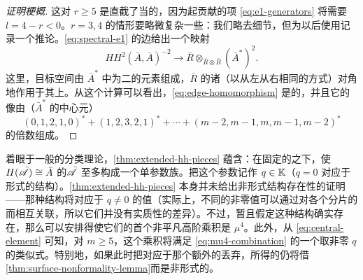 \begin{proof}[证明梗概]
这对 $r\ge 5$ 是直截了当的，因为起贡献的项 \eqref{eq:e1-generators} 将需要 $l=4-r<0$。$r=3,4$ 的情形要略微复杂一些：我们略去细节，但为以后使用记录一个推论。\eqref{eq:spectral-e1} 的边\trHomomorphism{}给出一个映射
\begin{equation}\label{eq:edge-homomorphism}
HH^2(\bar{A},\bar{A})^{-2}\longrightarrow
\bar{R}\otimes_{\bar{R}\otimes\bar{R}}(\bar{A}^*)^2.
\end{equation}
这里，目标空间由 $\bar{A}^*$ 中\trDegree{}为二的元素组成，$\bar{R}$ 的诸\trIdempotent{}（以从左从右相同的方式）对角地作用于其上。从这个计算可以看出，\eqref{eq:edge-homomorphism} 是\trInjective{}的，并且它的像由（$\bar{A}^*$ 的中心元）
\begin{equation}\label{eq:central-element}
(0,1,2,1,0)^*+(1,2,3,2,1)^*+\cdots+(m-2,m-1,m,m-1,m-2)^*
\end{equation}
的倍数组成。
\end{proof}
着眼于一般的分类理论，\cref{thm:extended-hh-pieces} 蕴含：在固定\trCohomology{}的\trQuasiisomorphism{}之下，使 $H(\bar{\mathscr{A}})\cong\bar{A}$ 的\trACategory{}$\bar{\mathscr{A}}$ 至多构成一个单参数族。把这个参数记作 $q\in\mathbb{K}$（$q=0$ 对应于形式的\trAinfty{}结构）。\cref{thm:extended-hh-pieces} 本身并未给出非形式结构存在性的证明——那种结构将对应于 $q\ne 0$ 的值（实际上，不同的非零值可以通过对各个\trGraded{}分片的\trRescaling{}而相互关联，所以它们并没有实质性的差异）。不过，暂且假定这种结构确实存在，那么可以安排得使它们的首个非平凡高阶乘积是 $\mu^4$。此外，从 \eqref{eq:central-element} 可知，对 $m\ge 5$，这个乘积将满足 \eqref{eq:mu4-combination} 的一个取非零 $q$ 的类似式。特别地，如果此时把对应于那个额外\trVertex{}的\trObject{}丢弃，所得的\trFullSubcategory{}仍将借\cref{thm:surface-nonformality-lemma}而是非形式的。
